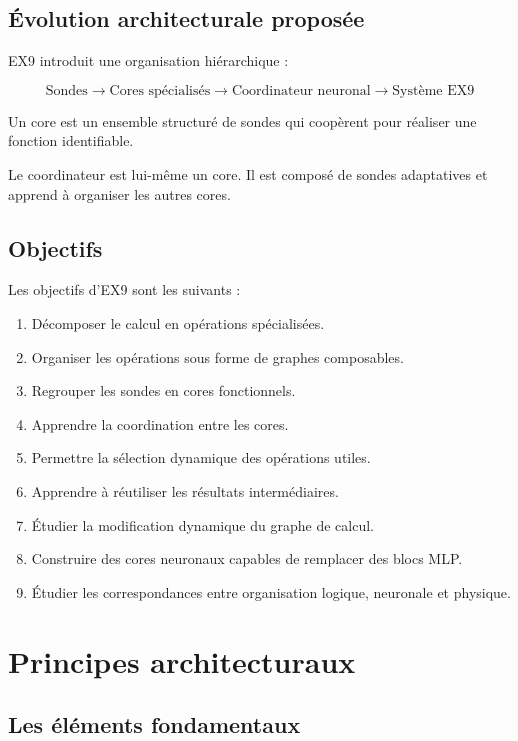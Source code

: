 \documentclass[11pt,a4paper]{article}
\begin{document}
\subsection{Évolution architecturale proposée}

EX9 introduit une organisation hiérarchique :

\[
\boxed{
\text{Sondes}
\longrightarrow
\text{Cores spécialisés}
\longrightarrow
\text{Coordinateur neuronal}
\longrightarrow
\text{Système EX9}
}
\]

Un core est un ensemble structuré de sondes qui coopèrent pour
réaliser une fonction identifiable.

Le coordinateur est lui-même un core. Il est composé de sondes
adaptatives et apprend à organiser les autres cores.

\subsection{Objectifs}

Les objectifs d'EX9 sont les suivants :

\begin{enumerate}
  \item Décomposer le calcul en opérations spécialisées.
  \item Organiser les opérations sous forme de graphes composables.
  \item Regrouper les sondes en cores fonctionnels.
  \item Apprendre la coordination entre les cores.
  \item Permettre la sélection dynamique des opérations utiles.
  \item Apprendre à réutiliser les résultats intermédiaires.
  \item Étudier la modification dynamique du graphe de calcul.
  \item Construire des cores neuronaux capables de remplacer des
        blocs MLP.
  \item Étudier les correspondances entre organisation logique,
        neuronale et physique.
\end{enumerate}

\section{Principes architecturaux}

\subsection{Les éléments fondamentaux}
\end{document}
